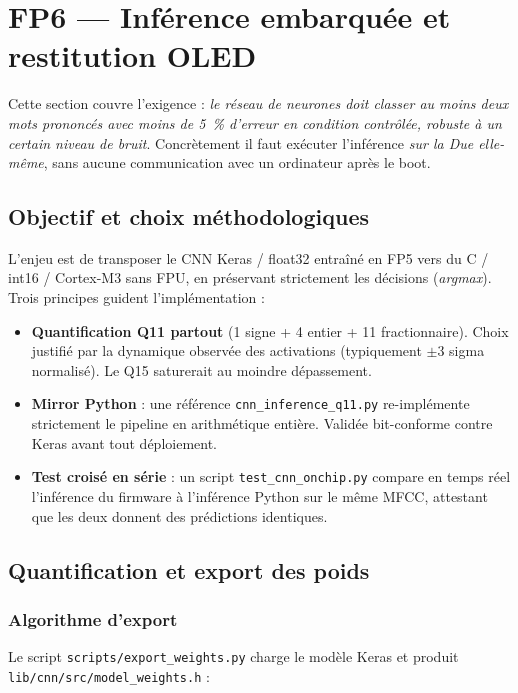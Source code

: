 \section{FP6 --- Inférence embarquée et restitution OLED}
\label{sec:fp6}

Cette section couvre l'exigence  : \emph{le réseau de neurones doit classer au moins deux mots prononcés avec moins de \SI{5}{\percent} d'erreur en condition contrôlée, robuste à un certain niveau de bruit}. Concrètement il faut exécuter l'inférence \emph{sur la Due elle-même}, sans aucune communication avec un ordinateur après le boot.

\subsection{Objectif et choix méthodologiques}

L'enjeu est de transposer le CNN Keras / float32 entraîné en FP5 vers du C / int16 / Cortex-M3 sans FPU, en préservant strictement les décisions (\emph{argmax}). Trois principes guident l'implémentation :

\begin{itemize}
    \item \textbf{Quantification Q11 partout} (1 signe + 4 entier + 11 fractionnaire). Choix justifié par la dynamique observée des activations (typiquement $\pm 3$ sigma normalisé). Le Q15 saturerait au moindre dépassement.
    \item \textbf{Mirror Python} : une référence \texttt{cnn\_inference\_q11.py} re-implémente strictement le pipeline en arithmétique entière. Validée bit-conforme contre Keras avant tout déploiement.
    \item \textbf{Test croisé en série} : un script \texttt{test\_cnn\_onchip.py} compare en temps réel l'inférence du firmware à l'inférence Python sur le même MFCC, attestant que les deux donnent des prédictions identiques.
\end{itemize}

\subsection{Quantification et export des poids}

\subsubsection{Algorithme d'export}

Le script \texttt{scripts/export\_weights.py} charge le modèle Keras et produit \texttt{lib/cnn/src/model\_weights.h} :

